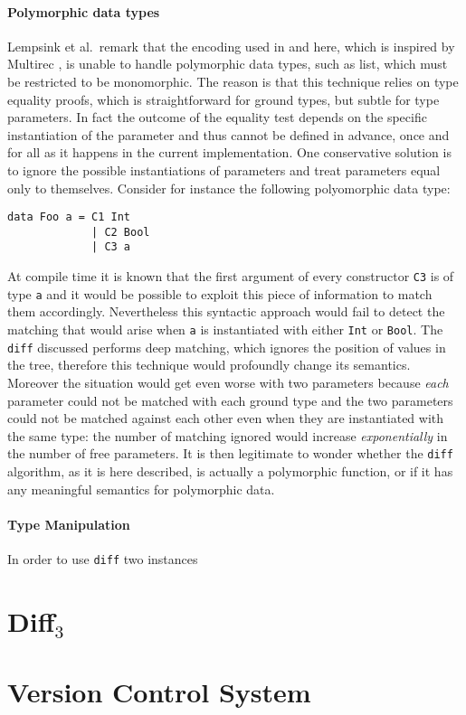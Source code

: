 \documentclass[../Thesis.tex]{subfiles}
\begin{document}
	\paragraph{Polymorphic data types}
	Lempsink et al.\ remark that the encoding used in \cite{Lemp09} and here,
	which is inspired by Multirec \cite{Multirec}, is unable to handle 
	polymorphic data types, such as list, which must be restricted to be 
	monomorphic.
	The reason is that this technique relies on type equality proofs,
	which is straightforward for ground types, but subtle for type parameters.
	In fact the outcome of the equality test depends on the specific
	instantiation of the parameter and thus cannot be defined in advance, once
	and for all as it happens in the current implementation.
	One conservative solution is to ignore the possible instantiations of 
	parameters and treat parameters equal only to themselves.
	Consider for instance the following polyomorphic data type:
	
\begin{verbatim}
data Foo a = C1 Int
             | C2 Bool
             | C3 a
\end{verbatim}
	At compile time it is known that the first argument of every constructor 
	\texttt{C3} is of type \texttt{a} and it would be possible to 
	exploit this piece of information	to match them accordingly.
	Nevertheless this syntactic approach would fail to detect the matching
	that would arise when \texttt{a} is instantiated with either \texttt{Int} or 
	\texttt{Bool}.
	The \texttt{diff} discussed performs deep matching, which ignores
	the position of values in the tree, therefore this technique would
	profoundly change its semantics. Moreover the situation would get even
	worse with two parameters because \emph{each} parameter could not be
	matched with each ground type and the two parameters could not
	be matched against each other even when they are instantiated with the
	same type: the number of matching ignored would increase 
	\emph{exponentially} in the number of free parameters.
	It is then legitimate to wonder whether the \texttt{diff} algorithm, as it
	is here described, is actually a polymorphic function, or if 	it has any 
	meaningful semantics for polymorphic data.
	

	\paragraph{Type Manipulation}
	In order to use \texttt{diff} two instances
	
	
	\section{Diff$_3$}
	\section{Version Control System}

	
 	
\end{document}
